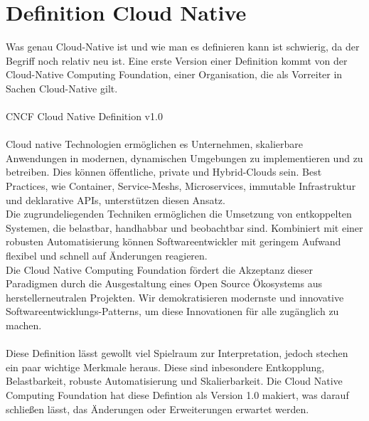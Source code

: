 \section{Definition Cloud Native}
Was genau Cloud-Native ist und wie man es definieren kann ist schwierig, da der Begriff noch relativ neu ist. Eine erste Version einer Definition kommt von der Cloud-Native Computing Foundation, einer Organisation, die als Vorreiter in Sachen Cloud-Native gilt.\\
\\
CNCF Cloud Native Definition v1.0\\
\\
Cloud native Technologien ermöglichen es Unternehmen, skalierbare Anwendungen in modernen, dynamischen Umgebungen zu implementieren und zu betreiben. Dies können öffentliche, private und Hybrid-Clouds sein. Best Practices, wie Container, Service-Meshs, Microservices, immutable Infrastruktur und deklarative APIs, unterstützen diesen Ansatz.
\\
Die zugrundeliegenden Techniken ermöglichen die Umsetzung von entkoppelten Systemen, die belastbar, handhabbar und beobachtbar sind. Kombiniert mit einer robusten Automatisierung können Softwareentwickler mit geringem Aufwand flexibel und schnell auf Änderungen reagieren.
\\
Die Cloud Native Computing Foundation fördert die Akzeptanz dieser Paradigmen durch die Ausgestaltung eines Open Source Ökosystems aus herstellerneutralen Projekten. Wir demokratisieren modernste und innovative Softwareentwicklungs-Patterns, um diese Innovationen für alle zugänglich zu machen.\\
\\
Diese Definition lässt gewollt viel Spielraum zur Interpretation, jedoch stechen ein paar wichtige Merkmale heraus. Diese sind inbesondere Entkopplung, Belastbarkeit, robuste Automatisierung und Skalierbarkeit. Die Cloud Native Computing Foundation hat diese Defintion als Version 1.0 makiert, was darauf schließen lässt, das Änderungen oder Erweiterungen erwartet werden.

